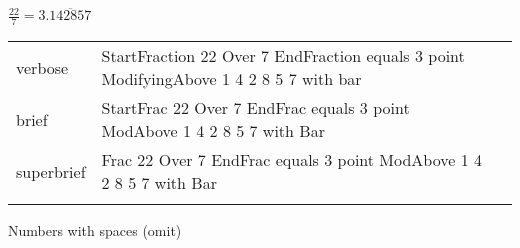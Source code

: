 \R
\E $\frac{22}{7}=3.\overline{142857}$
\begin{longtable}[c]{@{}lll@{}}
\toprule\addlinespace
verbose & StartFraction 22 Over 7 EndFraction equals 3 point
ModifyingAbove 1 4 2 8 5 7 with bar &

\\\addlinespace
brief & StartFrac 22 Over 7 EndFrac equals 3 point ModAbove 1 4 2 8 5 7
with Bar &

\\\addlinespace
superbrief & Frac 22 Over 7 EndFrac equals 3 point ModAbove 1 4 2 8 5 7
with Bar &

\\\addlinespace
\bottomrule
\end{longtable}

\R
Numbers with spaces (omit)

